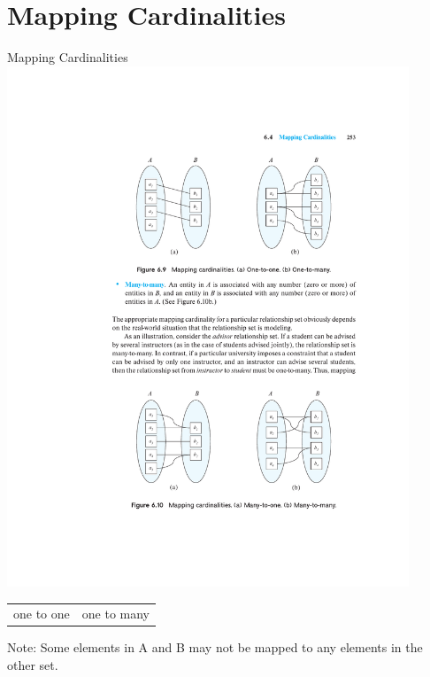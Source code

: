\documentclass{beamer}
\begin{document}
\section{Mapping Cardinalities}

\begin{frame}{Mapping Cardinalities}
    \centering
    \includegraphics[trim={6.75cm 17.5cm 3.75cm 4cm}, clip, width=0.9\textwidth]{figures/p253}
    \begin{tabularx}{\textwidth}{@{} Y Y @{}}
        one to one & one to many \\
    \end{tabularx}
    \begin{block}{Note:}
        Some elements in A and B may not be mapped to any elements in the other set.
    \end{block}
\end{frame}
\end{document}
